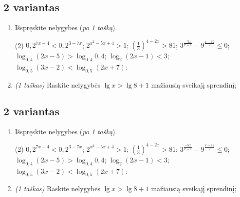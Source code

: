 \documentclass[a4paper]{article}
\begin{document}
\vspace*{6mm}

\subsection*{2 variantas}

\begin{enumerate}
      \item Išspręskite nelygybes (\textit{po 1 tašką}).

            \begin{tasks}[item-format={\normalfont}, after-item-skip=2mm](2)
                  \task $0,2^{7x-4} < 0,2^{3-7x}$;
                  \task $2^{x^2-5x+4} > 1$;
                  \task $(\frac{1}{3})^{4-2x} > 81$;
                  \task $3^{\frac{-5x}{x-1}}-9^{\frac{x-12}{2}} \leqslant 0$;
                  \task $\log_{0,4}(2x-5) > \log_{0,4}0,4$;
                  \task $\log_{2}(2x-1) < 3$;
                  \task $\log_{0,5}(3x-2) < \log_{0,5}(2x+7)$:
            \end{tasks}

      \item \textit{(1 taškas)} Raskite nelygybės $\lg{x}>\lg{8}+1$ mažiausią sveikajį sprendinį;

\end{enumerate}


\vspace*{6mm}

\subsection*{2 variantas}

\begin{enumerate}
      \item Išspręskite nelygybes (\textit{po 1 tašką}).

            \begin{tasks}[item-format={\normalfont}, after-item-skip=2mm](2)
                  \task $0,2^{7x-4} < 0,2^{3-7x}$;
                  \task $2^{x^2-5x+4} > 1$;
                  \task $(\frac{1}{3})^{4-2x} > 81$;
                  \task $3^{\frac{-5x}{x-1}}-9^{\frac{x-12}{2}} \leqslant 0$;
                  \task $\log_{0,4}(2x-5) > \log_{0,4}0,4$;
                  \task $\log_{2}(2x-1) < 3$;
                  \task $\log_{0,5}(3x-2) < \log_{0,5}(2x+7)$:
            \end{tasks}

      \item \textit{(1 taškas)} Raskite nelygybės $\lg{x}>\lg{8}+1$ mažiausią sveikajį sprendinį;

\end{enumerate}
\end{document}

